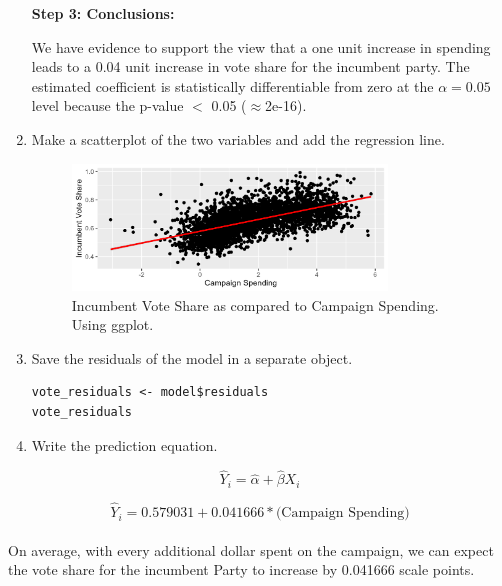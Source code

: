 \documentclass[12pt,letterpaper]{article}
\begin{document}
\begin{enumerate}
\begin{verbatim}
		\end{verbatim}
		
\textbf{Step 3: Conclusions:}
		
		We have evidence to support the view that a one unit increase in spending leads to a 0.04 unit increase in vote share for the incumbent party. The estimated coefficient is statistically differentiable from zero at the $\alpha=0.05$ level because the p-value $<$ 0.05 ($\approx $2e-16).
		

\newpage
		
		\item Make a scatterplot of the two variables and add the regression line. 	
		
		  
		
\begin{figure}[h!]
			
	\centering
	\caption{\footnotesize Incumbent Vote Share as compared to Campaign Spending. Using ggplot.}
	\includegraphics[width=0.79\textwidth]{vote_share_incumbent_scatter.png}
	
\end{figure}

		
		
		
		\item Save the residuals of the model in a separate object.	
		
			\begin{verbatim}
vote_residuals <- model$residuals
vote_residuals
		\end{verbatim}
		
		\item Write the prediction equation.
		
			\end{enumerate}		
			
{\large 			$$\hat{Y}_i = \hat{\alpha} +  \hat{\beta}X_i $$}


{ 			$$\hat{Y}_i = 0.579031 +  0.041666 * \text{(Campaign Spending)} $$} \\

	
\noindent On average, with every additional dollar spent on the campaign, we can expect the vote share for the incumbent Party to increase by 0.041666 scale points. \\
\end{document}
